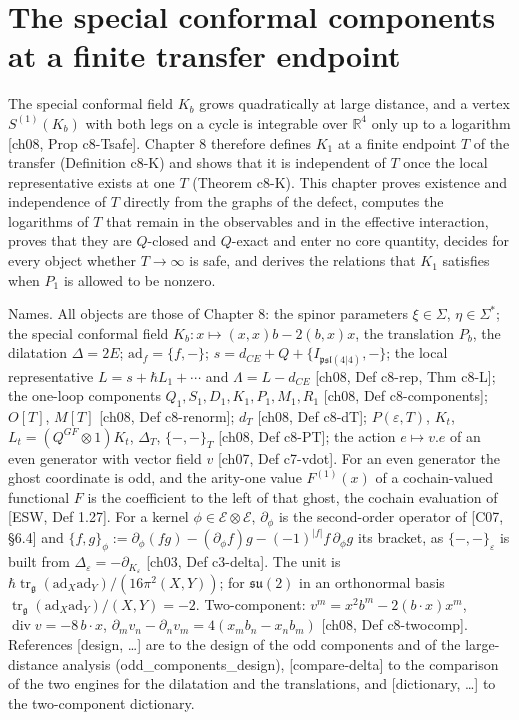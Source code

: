 \chapter{The special conformal components at a finite transfer endpoint}

The special conformal field $K_b$ grows quadratically at large distance, and a vertex $S^{(1)}(K_b)$ with both legs on a cycle is integrable over $\mathbb R^4$ only up to a logarithm [ch08, Prop c8-Tsafe]. Chapter 8 therefore defines $K_1$ at a finite endpoint $T$ of the transfer (Definition c8-K) and shows that it is independent of $T$ once the local representative exists at one $T$ (Theorem c8-K). This chapter proves existence and independence of $T$ directly from the graphs of the defect, computes the logarithms of $T$ that remain in the observables and in the effective interaction, proves that they are $Q$-closed and $Q$-exact and enter no core quantity, decides for every object whether $T\to\infty$ is safe, and derives the relations that $K_1$ satisfies when $P_1$ is allowed to be nonzero.

Names. All objects are those of Chapter 8: the spinor parameters $\xi\in\Sigma$, $\eta\in\Sigma^*$; the special conformal field $K_b\colon x\mapsto(x,x)b-2(b,x)x$, the translation $P_b$, the dilatation $\Delta=2E$; $\mathrm{ad}_f=\{f,-\}$; $s=d_{CE}+Q+\{I_{\mathfrak{psl}(4|4)},-\}$; the local representative $L=s+\hbar L_1+\cdots$ and $\Lambda=L-d_{CE}$ [ch08, Def c8-rep, Thm c8-L]; the one-loop components $Q_1,S_1,D_1,K_1,P_1,M_1,R_1$ [ch08, Def c8-components]; $O[T]$, $M[T]$ [ch08, Def c8-renorm]; $d_T$ [ch08, Def c8-dT]; $P(\varepsilon,T)$, $K_t$, $L_t=(Q^{GF}\otimes1)K_t$, $\Delta_T$, $\{-,-\}_T$ [ch08, Def c8-PT]; the action $e\mapsto v.e$ of an even generator with vector field $v$ [ch07, Def c7-vdot]. For an even generator the ghost coordinate is odd, and the arity-one value $F^{(1)}(x)$ of a cochain-valued functional $F$ is the coefficient to the left of that ghost, the cochain evaluation of [ESW, Def 1.27]. For a kernel $\phi\in\mathscr E\otimes\mathscr E$, $\partial_\phi$ is the second-order operator of [C07, §6.4] and $\{f,g\}_\phi:=\partial_\phi(fg)-(\partial_\phi f)g-(-1)^{|f|}f\,\partial_\phi g$ its bracket, as $\{-,-\}_\varepsilon$ is built from $\Delta_\varepsilon=-\partial_{K_\varepsilon}$ [ch03, Def c3-delta]. The unit is $\hbar\operatorname{tr}_{\mathfrak g}(\mathrm{ad}_X\mathrm{ad}_Y)/(16\pi^2(X,Y))$; for $\mathfrak{su}(2)$ in an orthonormal basis $\operatorname{tr}_{\mathfrak g}(\mathrm{ad}_X\mathrm{ad}_Y)/(X,Y)=-2$. Two-component: $v^m=x^2b^m-2(b\cdot x)x^m$, $\operatorname{div}v=-8\,b\cdot x$, $\partial_mv_n-\partial_nv_m=4(x_mb_n-x_nb_m)$ [ch08, Def c8-twocomp]. References [design, \dots] are to the design of the odd components and of the large-distance analysis (odd\_components\_design), [compare-delta] to the comparison of the two engines for the dilatation and the translations, and [dictionary, \dots] to the two-component dictionary.

